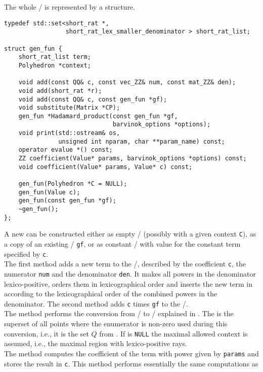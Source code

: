 The whole \rgf/ is represented by a 
structure.
\begin{verbatim}
typedef std::set<short_rat *,
                 short_rat_lex_smaller_denominator > short_rat_list;

struct gen_fun {
    short_rat_list term;
    Polyhedron *context;

    void add(const QQ& c, const vec_ZZ& num, const mat_ZZ& den);
    void add(short_rat *r);
    void add(const QQ& c, const gen_fun *gf);
    void substitute(Matrix *CP);
    gen_fun *Hadamard_product(const gen_fun *gf,
                              barvinok_options *options);
    void print(std::ostream& os,
               unsigned int nparam, char **param_name) const;
    operator evalue *() const;
    ZZ coefficient(Value* params, barvinok_options *options) const;
    void coefficient(Value* params, Value* c) const;

    gen_fun(Polyhedron *C = NULL);
    gen_fun(Value c);
    gen_fun(const gen_fun *gf);
    ~gen_fun();
};
\end{verbatim}
A new  can be constructed either as empty \rgf/ (possibly
with a given context \verb+C+), as a copy of an existing \rgf/ \verb+gf+, or as 
constant \rgf/ with value for the constant term specified by \verb+c+.
\\
The first  method adds a new term to the \rgf/,
described by the coefficient \verb+c+, the numerator \verb+num+ and the
denominator \verb+den+.
It makes all powers in the denominator lexico-positive,
orders them in lexicographical order and inserts the new
term in  according to the lexicographical
order of the combined powers in the denominator.
The second  method adds \verb+c+ times \verb+gf+
to the \rgf/.
\\
The method  performs
the conversion from \rgf/ to \psp/ explained in 
.
The   is the superset
of all points where the enumerator is non-zero used during this conversion,
i.e., it is the set $Q$ from .
If   is \verb+NULL+ the maximal
allowed context is assumed, i.e., the maximal
region with lexico-positive rays.  
\\
The method  computes the coefficient
of the term with power given by \verb+params+ and stores the result
in \verb+c+.
This method performs essentially the same computations as
